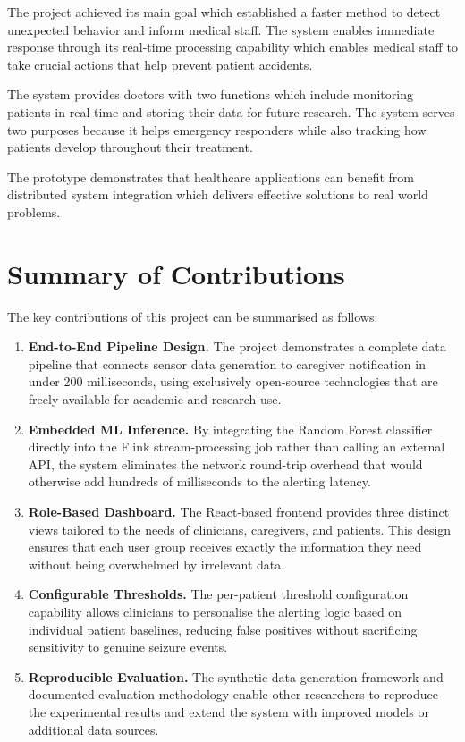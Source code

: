 \documentclass[12pt, a4paper, oneside]{report}
\begin{document}
The project achieved its main goal which established a faster method to detect unexpected behavior and inform medical staff. The system enables immediate response through its real-time processing capability which enables medical staff to take crucial actions that help prevent patient accidents.

The system provides doctors with two functions which include monitoring patients in real time and storing their data for future research. The system serves two purposes because it helps emergency responders while also tracking how patients develop throughout their treatment.

The prototype demonstrates that healthcare applications can benefit from distributed system integration which delivers effective solutions to real world problems.

\section{Summary of Contributions}

The key contributions of this project can be summarised as follows:

\begin{enumerate}
    \item \textbf{End-to-End Pipeline Design.} The project demonstrates a complete data pipeline that connects sensor data generation to caregiver notification in under 200 milliseconds, using exclusively open-source technologies that are freely available for academic and research use.
    \item \textbf{Embedded ML Inference.} By integrating the Random Forest classifier directly into the Flink stream-processing job rather than calling an external API, the system eliminates the network round-trip overhead that would otherwise add hundreds of milliseconds to the alerting latency.
    \item \textbf{Role-Based Dashboard.} The React-based frontend provides three distinct views tailored to the needs of clinicians, caregivers, and patients. This design ensures that each user group receives exactly the information they need without being overwhelmed by irrelevant data.
    \item \textbf{Configurable Thresholds.} The per-patient threshold configuration capability allows clinicians to personalise the alerting logic based on individual patient baselines, reducing false positives without sacrificing sensitivity to genuine seizure events.
    \item \textbf{Reproducible Evaluation.} The synthetic data generation framework and documented evaluation methodology enable other researchers to reproduce the experimental results and extend the system with improved models or additional data sources.
\end{enumerate}
\end{document}
